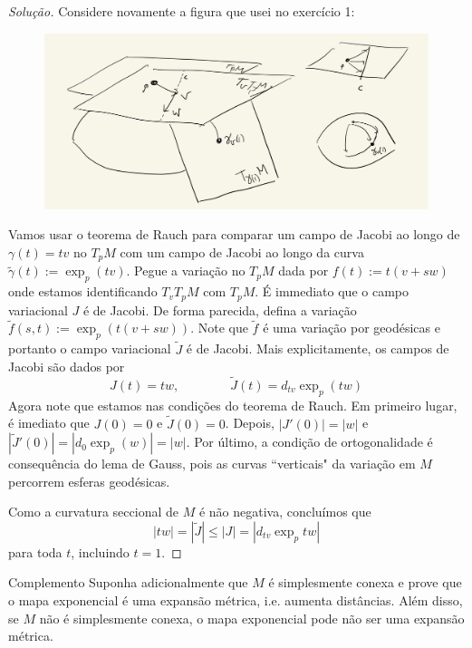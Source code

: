 \begin{proof}[Solução]\leavevmode
	Considere novamente a figura que usei no exercício 1:
	\begin{figure}[H]
		\centering
		\includegraphics[width=\textwidth]{fig8}
	\end{figure}
Vamos usar o teorema de Rauch para comparar um campo de Jacobi ao longo de \(\gamma(t)=tv\) no \(T_pM\) com um campo de Jacobi ao longo da curva  \(\tilde{\gamma}(t):=\operatorname{exp}_p(tv)\). Pegue a variação no \(T_pM\) dada por \(f(t):=t(v+sw)\) onde estamos identificando \(T_vT_pM\) com \(T_pM\). É immediato que o campo variacional \(J\) é de Jacobi. De forma parecida, defina a variação \(\tilde{f}(s,t):=\operatorname{exp}_{p}(t(v+sw))\). Note que \(\tilde{f}\) é uma variação por geodésicas e portanto o campo variacional \(\tilde{J}\) é de Jacobi. Mais explicitamente, os campos de Jacobi são dados por
\[J(t)=tw,\qquad \qquad \tilde{J}(t)=d_{tv}\operatorname{exp}_{p}(tw)\]
Agora note que estamos nas condições do teorema de Rauch. Em primeiro lugar, é imediato que \(J(0)=0\) e \(\tilde{J}(0)=0\). Depois, \(|J'(0)|=|w|\) e \(|\tilde{J}'(0)|=|d_0\operatorname{exp}_p(w)|=|w|\). Por último, a condição de ortogonalidade é consequência do lema de Gauss, pois as curvas ``verticais" da variação em \(M\) percorrem esferas geodésicas.

Como a curvatura seccional de \(M\) é não negativa, concluímos que \[|tw|=|\tilde{J}|\leq |J|=|d_{tv}\operatorname{exp}_ptw|\]
para toda \(t\), incluindo \(t=1\).
\end{proof}

\begin{thing6}{Complemento}\leavevmode
Suponha adicionalmente que \(M\) é simplesmente conexa e prove que o mapa exponencial é uma expansão métrica, i.e. aumenta distâncias. Além disso, se \(M\) não é simplesmente conexa, o mapa exponencial pode não ser uma expansão métrica.
\end{thing6}

